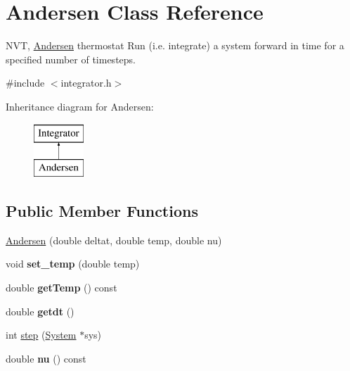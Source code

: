 \hypertarget{classAndersen}{\section{Andersen Class Reference}
\label{classAndersen}
}


N\-V\-T, \hyperlink{classAndersen}{Andersen} thermostat Run (i.\-e. integrate) a system forward in time for a specified number of timesteps.  




{\ttfamily \#include $<$integrator.\-h$>$}

Inheritance diagram for Andersen\-:\begin{figure}[H]
\begin{center}
\leavevmode
\includegraphics[height=2.000000cm]{classAndersen}
\end{center}
\end{figure}
\subsection*{Public Member Functions}
\begin{DoxyCompactItemize}
\item 
\hyperlink{classAndersen_a1234214695cde894eb0f3da49e63b53f}{Andersen} (double deltat, double temp, double nu)
\item 
\hypertarget{classAndersen_a600ded26c24fb099880be97e1bf6b778}{void {\bfseries set\-\_\-temp} (double temp)}\label{classAndersen_a600ded26c24fb099880be97e1bf6b778}

\item 
\hypertarget{classAndersen_acba0beac53d9fd9de7ac607c0b5d530e}{double {\bfseries get\-Temp} () const }\label{classAndersen_acba0beac53d9fd9de7ac607c0b5d530e}

\item 
\hypertarget{classAndersen_a5316d4c5545689208f69a371bacf5664}{double {\bfseries getdt} ()}\label{classAndersen_a5316d4c5545689208f69a371bacf5664}

\item 
int \hyperlink{classAndersen_a0d61b4c49eba214fdf38af544758d9cc}{step} (\hyperlink{classSystem}{System} $\ast$sys)
\item 
\hypertarget{classAndersen_a6ee278d57758012c461219202b88c91b}{double {\bfseries nu} () const }\label{classAndersen_a6ee278d57758012c461219202b88c91b}

\end{DoxyCompactItemize}
